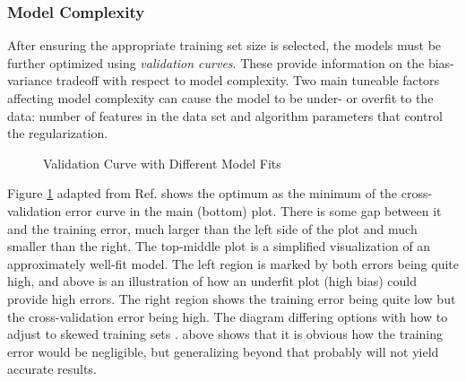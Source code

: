 \subsubsection{Model Complexity}

After ensuring the appropriate training set size is selected, the models must
be further optimized using \textit{validation curves}.  These provide
information on the bias-variance tradeoff with respect to model complexity. Two
main tuneable factors affecting model complexity can cause the model to be
under- or overfit to the data: number of features in the data set and algorithm
parameters that control the regularization.

\begin{figure}[!htb]
  \centering
  \caption{Validation Curve with Different Model Fits}
  \label{fig:validation}
\end{figure}

Figure \ref{fig:validation} adapted from Ref. \cite{elements_stats} shows the
optimum as the minimum of the cross-validation error curve in the main (bottom) plot. There is some gap
between it and the training error, much larger than the left side of the plot
and much smaller than the right.  The top-middle plot is a simplified
visualization of an approximately well-fit model.  The left region is marked by
both errors being quite high, and above is an  illustration of how an underfit
plot (high bias) could provide high errors. The right region shows the training
error being quite low but the cross-validation error being high. The diagram
differing options with how to adjust to skewed training sets \cite{scikit}.
above shows that it is obvious how the training error would be negligible, but
generalizing beyond that probably will not yield accurate results. 

